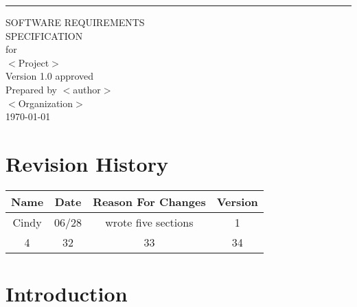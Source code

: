 \documentclass{scrreprt}
\date{}
\def\myversion{1.0 }
\begin{document}
\begin{flushright}
    \rule{16cm}{5pt}\vskip1cm
    \begin{bfseries}
        \Huge{SOFTWARE REQUIREMENTS\\ SPECIFICATION}\\
        \vspace{1.9cm}
        for\\
        \vspace{1.9cm}
        $<$Project$>$\\
        \vspace{1.9cm}
        \LARGE{Version \myversion approved}\\
        \vspace{1.9cm}
        Prepared by $<$author$>$\\
        \vspace{1.9cm}
        $<$Organization$>$\\
        \vspace{1.9cm}
        \today\\
    \end{bfseries}
\end{flushright}

\tableofcontents


\chapter*{Revision History}

\begin{center}
    \begin{tabular}{|c|c|c|c|}
        \hline
	    Name & Date & Reason For Changes & Version\\
        \hline
	    Cindy & 06/28 & wrote five sections & 1\\
        \hline
	    4 & 32 & 33 & 34\\
        \hline
    \end{tabular}
\end{center}

\chapter{Introduction}
\end{document}
